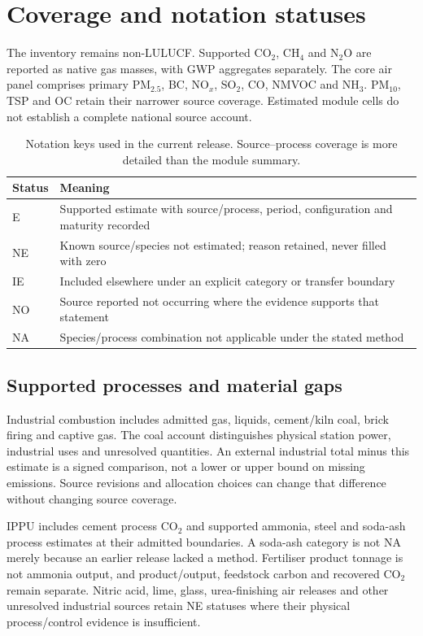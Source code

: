 \section{Coverage and notation statuses}
\label{sec:completeness}
The inventory remains non-LULUCF. Supported CO$_2$, CH$_4$ and N$_2$O are reported as native gas masses, with GWP aggregates separately. The core air panel comprises primary PM$_{2.5}$, BC, NO$_x$, SO$_2$, CO, NMVOC and NH$_3$. PM$_{10}$, TSP and OC retain their narrower source coverage. Estimated module cells do not establish a complete national source account.

\begin{table}[htbp]\centering\small
\begin{tabular}{@{}lp{.76\linewidth}@{}}\toprule
Status & Meaning\\\midrule
E & Supported estimate with source/process, period, configuration and maturity recorded\\
NE & Known source/species not estimated; reason retained, never filled with zero\\
IE & Included elsewhere under an explicit category or transfer boundary\\
NO & Source reported not occurring where the evidence supports that statement\\
NA & Species/process combination not applicable under the stated method\\\bottomrule
\end{tabular}
\caption{Notation keys used in the current release. Source--process coverage is more detailed than the module summary.}\label{tab:completeness}
\end{table}

\subsection{Supported processes and material gaps}
Industrial combustion includes admitted gas, liquids, cement/kiln coal, brick firing and captive gas. The coal account distinguishes physical station power, industrial uses and unresolved quantities. An external industrial total minus this estimate is a signed comparison, not a lower or upper bound on missing emissions. Source revisions and allocation choices can change that difference without changing source coverage.

IPPU includes cement process CO$_2$ and supported ammonia, steel and soda-ash process estimates at their admitted boundaries. A soda-ash category is not NA merely because an earlier release lacked a method. Fertiliser product tonnage is not ammonia output, and product/output, feedstock carbon and recovered CO$_2$ remain separate. Nitric acid, lime, glass, urea-finishing air releases and other unresolved industrial sources retain NE statuses where their physical process/control evidence is insufficient.

